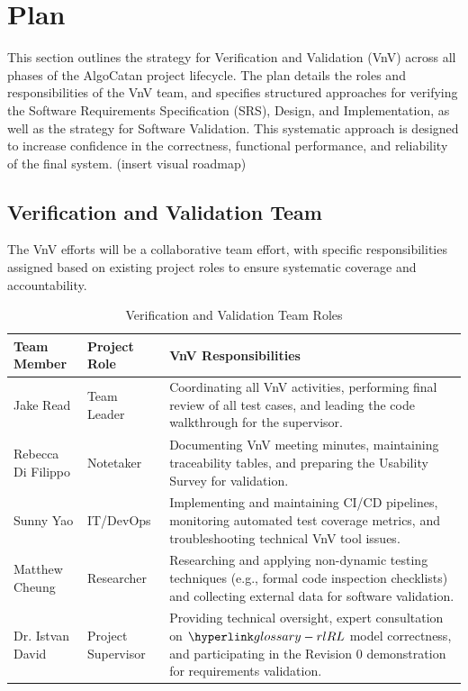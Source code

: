 \documentclass[12pt, titlepage]{article}
\begin{document}
\section{Plan}

This section outlines the strategy for Verification and Validation (VnV) across all phases of the AlgoCatan project lifecycle.
The plan details the roles and responsibilities of the VnV team, and specifies structured approaches for verifying the Software Requirements Specification (SRS), Design, and Implementation, as well as the strategy for Software Validation.
This systematic approach is designed to increase confidence in the correctness, functional performance, and reliability of the final system.
(insert visual roadmap)


\subsection{Verification and Validation Team}




The VnV efforts will be a collaborative team effort, with specific responsibilities assigned based on existing project roles to ensure systematic coverage and accountability.

\begin{table}[h!]
  \centering
  \caption{Verification and Validation Team Roles}
  \label{tab:vnv-team-roles}
  \begin{tabularx}{\textwidth}{|p{2cm}|p{2cm}|X|}
  \hline
  \textbf{Team Member} & \textbf{Project Role} & \textbf{VnV Responsibilities} \\ \hline
  Jake Read & Team Leader & Coordinating all VnV activities, performing final review of all test cases, and leading the code walkthrough for the supervisor. \\ \hline
  Rebecca Di Filippo & Notetaker & Documenting VnV meeting minutes, maintaining traceability tables, and preparing the Usability Survey for validation. \\ \hline
  Sunny Yao & IT/DevOps & Implementing and maintaining CI/CD pipelines, monitoring automated test coverage metrics, and troubleshooting technical VnV tool issues. \\ \hline
  Matthew Cheung & Researcher & Researching and applying non-dynamic testing techniques (e.g., formal code inspection checklists) and collecting external data for software validation. \\ \hline
  Dr. Istvan David & Project Supervisor & Providing technical oversight, expert consultation on $\RL{}$ model correctness, and participating in the Revision 0 demonstration for requirements validation. \\ \hline
  \end{tabularx}
\end{table}
\end{document}
